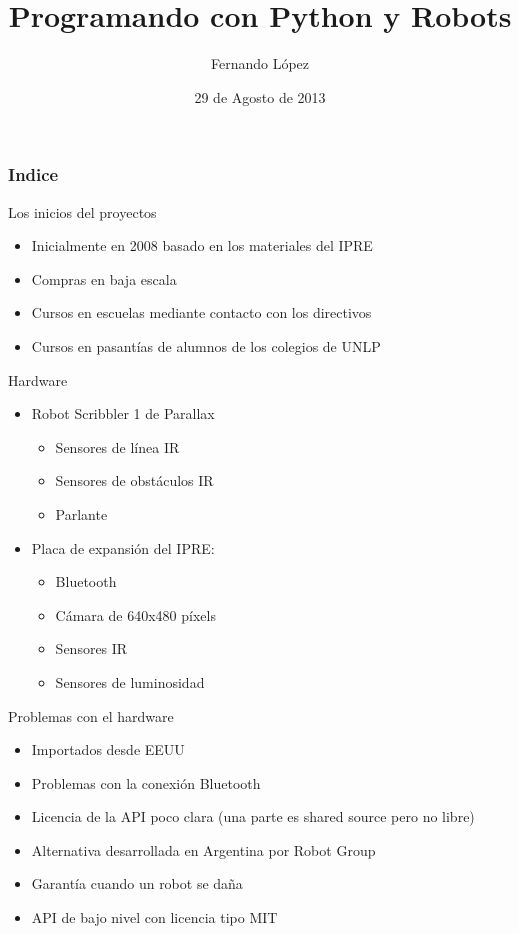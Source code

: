 \documentclass{beamer}[10]
\title{Programando con Python y Robots}
\author{Fernando López}
\institute{LINTI \\ Facultad de Informática \\ Universidad Nacional de la Plata
}
\date{29 de Agosto de 2013}
\begin{document}
\frame{\titlepage \vspace{-0.5cm}

}


\frame
{
\frametitle{Indice}
\tableofcontents[pausesection]
}

\begin{frame}{Los inicios del proyectos}
\begin{itemize}[<+->]
	\item Inicialmente en 2008 basado en los materiales del IPRE
	\item Compras en baja escala
	\item Cursos en escuelas mediante contacto con los directivos
	\item Cursos en pasantías de alumnos de los colegios de UNLP
\end{itemize}
\end{frame}
\begin{frame}{Hardware}
	\begin{itemize}[<+->]
		\item Robot Scribbler 1 de Parallax
		\begin{itemize}
			\item Sensores de línea IR
			\item Sensores de obstáculos IR
			\item Parlante
		\end{itemize}
		\item Placa de expansión del IPRE:
		\begin{itemize}
			\item Bluetooth
			\item Cámara de 640x480 píxels
			\item Sensores IR
			\item Sensores de luminosidad
		\end{itemize}
	\end{itemize}
\end{frame}
\begin{frame}{Problemas con el hardware}
	\begin{itemize}[<+->]
		\item Importados desde EEUU
		\item Problemas con la conexión Bluetooth
		\item Licencia de la API poco clara (una parte es shared source pero no libre)
	\end{itemize}
	\begin{itemize}[<+->]
		\item Alternativa desarrollada en Argentina por Robot Group
		\item Garantía cuando un robot se daña
		\item API de bajo nivel con licencia tipo MIT
	\end{itemize}
\end{frame}
\end{document}

